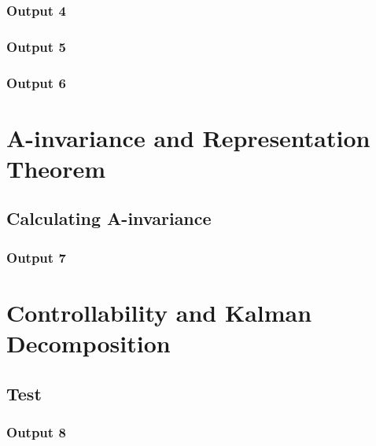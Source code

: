 \documentclass[10pt]{article}
\begin{document}
\subsubsection{Output 4}
\subsubsection{Output 5}
\subsubsection{Output 6}

\section{A-invariance and Representation Theorem}
\subsection{Calculating A-invariance}
\subsubsection{Output 7}

\section{Controllability and Kalman Decomposition}
\subsection{Test}
\subsubsection{Output 8}
\end{document}
